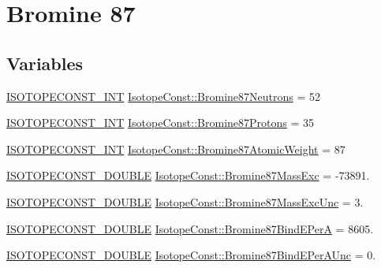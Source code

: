 \hypertarget{group___isotope_const-_bromine-_br87}{}\section{Bromine 87}
\label{group___isotope_const-_bromine-_br87}
\subsection*{Variables}
\begin{DoxyCompactItemize}
\item 
\mbox{\hyperlink{group___isotope_const-_macros_ga5f18360b3e99483a35c32d789e62621c}{I\+S\+O\+T\+O\+P\+E\+C\+O\+N\+S\+T\+\_\+\+I\+NT}} \mbox{\hyperlink{group___isotope_const-_bromine-_br87_ga9dd64e27e11339824addc7087ad02d56}{Isotope\+Const\+::\+Bromine87\+Neutrons}} = 52
\item 
\mbox{\hyperlink{group___isotope_const-_macros_ga5f18360b3e99483a35c32d789e62621c}{I\+S\+O\+T\+O\+P\+E\+C\+O\+N\+S\+T\+\_\+\+I\+NT}} \mbox{\hyperlink{group___isotope_const-_bromine-_br87_ga8f27758a925ec411edb5b6cd2a501cc5}{Isotope\+Const\+::\+Bromine87\+Protons}} = 35
\item 
\mbox{\hyperlink{group___isotope_const-_macros_ga5f18360b3e99483a35c32d789e62621c}{I\+S\+O\+T\+O\+P\+E\+C\+O\+N\+S\+T\+\_\+\+I\+NT}} \mbox{\hyperlink{group___isotope_const-_bromine-_br87_gaad115d011fdae7c7b8e46ce5cae38f39}{Isotope\+Const\+::\+Bromine87\+Atomic\+Weight}} = 87
\item 
\mbox{\hyperlink{group___isotope_const-_macros_ga8f45a7272ce02c0b4c65c44636ed719a}{I\+S\+O\+T\+O\+P\+E\+C\+O\+N\+S\+T\+\_\+\+D\+O\+U\+B\+LE}} \mbox{\hyperlink{group___isotope_const-_bromine-_br87_ga301b77066bcfaab84b2a8e77b8118558}{Isotope\+Const\+::\+Bromine87\+Mass\+Exc}} = -\/73891.
\item 
\mbox{\hyperlink{group___isotope_const-_macros_ga8f45a7272ce02c0b4c65c44636ed719a}{I\+S\+O\+T\+O\+P\+E\+C\+O\+N\+S\+T\+\_\+\+D\+O\+U\+B\+LE}} \mbox{\hyperlink{group___isotope_const-_bromine-_br87_ga6e46e1382a8ef11719ee3c72e8ed2fdb}{Isotope\+Const\+::\+Bromine87\+Mass\+Exc\+Unc}} = 3.
\item 
\mbox{\hyperlink{group___isotope_const-_macros_ga8f45a7272ce02c0b4c65c44636ed719a}{I\+S\+O\+T\+O\+P\+E\+C\+O\+N\+S\+T\+\_\+\+D\+O\+U\+B\+LE}} \mbox{\hyperlink{group___isotope_const-_bromine-_br87_ga73b2bc99e2e14b42e12fca9534fe04b9}{Isotope\+Const\+::\+Bromine87\+Bind\+E\+PerA}} = 8605.
\item 
\mbox{\hyperlink{group___isotope_const-_macros_ga8f45a7272ce02c0b4c65c44636ed719a}{I\+S\+O\+T\+O\+P\+E\+C\+O\+N\+S\+T\+\_\+\+D\+O\+U\+B\+LE}} \mbox{\hyperlink{group___isotope_const-_bromine-_br87_ga0f0df7ff631d5abf106b575c12bd4952}{Isotope\+Const\+::\+Bromine87\+Bind\+E\+Per\+A\+Unc}} = 0.

\end{DoxyCompactItemize}
